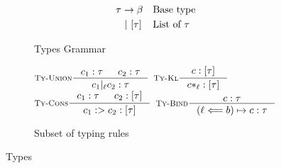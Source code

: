 \begin{figure}
\begin{subfigure}[t]{1\linewidth}\footnotesize
\begin{center}
    \begin{align*}
        \mathit{\tau} & \to \beta && \text{Base type}    \\
            & \ |\  [\tau] && \text{List of $\tau$}    \\
    \end{align*}
\caption{Types Grammar}
\label{fig:the-type-language-grammar}
\end{center}

\end{subfigure}
\begin{subfigure}[t]{1\linewidth}\footnotesize
\begin{center}
$\inference
    [\tyunion]
    {\hastype{\core_1}{\type} & \hastype{\core_2}{\type}}
    {\hastype{\core_1 |_{\lab}\core_2}{\type}}$
$\inference
    [\tystar]
    {\hastype{\core}{[\type]}}
    {\hastype{\core*_{\lab}}{[\type]}}$
$\inference
    [\tycons]
    {\hastype{\core_1}{\type} & \hastype{\core_2}{[\type]}}
    {\hastype{\core_1 \cons \core_2}{[\type]}}$
$\inference
    [\tybind]
    {\hastype{\core}{\type}}
    {\hastype{(\lab \Longleftarrow b) \asgnarrow \core}{\type}}$
\end{center}
\caption{Subset of typing rules}
\label{fig:the-type-language-rules}
\end{subfigure}

\caption{Types}
\label{fig:the-type-language}
\end{figure}
